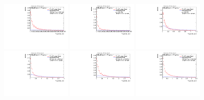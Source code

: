 \begin{figure}[H]
\includegraphics[width=0.3\textwidth]{sascha_input/Appendix/Distributions/w/distributions/beta3/h_normal_tj_C2_3_bin5.pdf} \hspace{1mm}
\includegraphics[width=0.3\textwidth]{sascha_input/Appendix/Distributions/w/distributions/beta3/h_normal_tj_C2_3_bin6.pdf} 
\bigskip
\includegraphics[width=0.3\textwidth]{sascha_input/Appendix/Distributions/w/distributions/beta3/h_normal_tj_D2_3_bin1.pdf} \hspace{1mm}
\includegraphics[width=0.3\textwidth]{sascha_input/Appendix/Distributions/w/distributions/beta3/h_normal_tj_D2_3_bin2.pdf} \hspace{1mm}
\includegraphics[width=0.3\textwidth]{sascha_input/Appendix/Distributions/w/distributions/beta3/h_normal_tj_D2_3_bin3.pdf} 
\bigskip
\includegraphics[width=0.3\textwidth]{sascha_input/Appendix/Distributions/w/distributions/beta3/h_normal_tj_D2_3_bin4.pdf} \hspace{1mm}

\end{figure}
